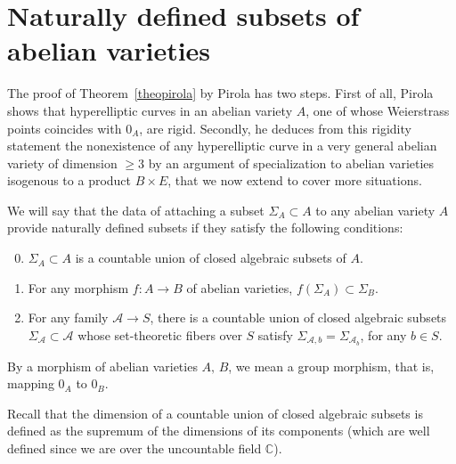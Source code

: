 \section{Naturally defined subsets of abelian varieties}\label{secpirola}

The proof of Theorem~\ref{theopirola} by Pirola has two steps. First of all, Pirola shows that hyperelliptic curves in an abelian variety $A$, one of whose Weierstrass points coincides with $0_A$, are rigid. Secondly, he deduces from this rigidity statement the nonexistence of any hyperelliptic curve in a very general abelian variety of dimension $\geq 3$ by an argument of specialization to abelian varieties isogenous to a product $B\times E$, that we now extend to cover more situations.

\begin{defi}\label{definat}
We will say that the data of attaching a subset $\Sigma_A\subset A$ to any abelian variety $A$ provide naturally defined subsets if they satisfy
the following conditions:
\begin{enumerate}\setcounter{enumi}{-1}
\item \label{2.1.0} $\Sigma_A\subset A$ is a countable union of closed algebraic subsets of $A$.
\item \label{2.1.1} For any morphism $f:A\rightarrow B$ of abelian varieties, $f(\Sigma_A)\subset \Sigma_B$.
\item \label{2.1.2} For any family $\mathcal{A}\rightarrow S$, there is a countable union of closed algebraic subsets $\Sigma_{\mathcal{A}}\subset \mathcal{A}$ whose set-theoretic fibers over $S$ satisfy $\Sigma_{\mathcal{A},b}=\Sigma_{\mathcal{A}_b}$, for any $b\in S$.
\end{enumerate}
\end{defi}

\begin{rema}
By a morphism of abelian varieties $A,\,B$, we mean a group morphism, that is, mapping $0_A$ to $0_B$.
\end{rema}

Recall that the dimension of a countable union of closed algebraic subsets is defined as the supremum of the dimensions of its components (which are well defined since we are over the uncountable field $ \mathbb{C}$).


